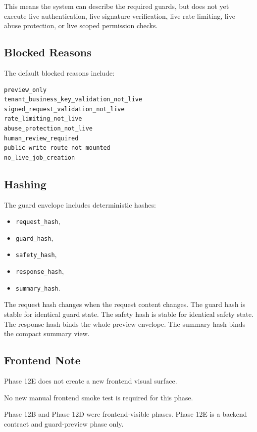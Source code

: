 This means the system can describe the required guards, but does not yet execute live authentication, live signature verification, live rate limiting, live abuse protection, or live scoped permission checks.

\subsection{Blocked Reasons}

The default blocked reasons include:

\begin{verbatim}
preview_only
tenant_business_key_validation_not_live
signed_request_validation_not_live
rate_limiting_not_live
abuse_protection_not_live
human_review_required
public_write_route_not_mounted
no_live_job_creation
\end{verbatim}

\subsection{Hashing}

The guard envelope includes deterministic hashes:

\begin{itemize}
  \item \texttt{request\_hash},
  \item \texttt{guard\_hash},
  \item \texttt{safety\_hash},
  \item \texttt{response\_hash},
  \item \texttt{summary\_hash}.
\end{itemize}

The request hash changes when the request content changes.
The guard hash is stable for identical guard state.
The safety hash is stable for identical safety state.
The response hash binds the whole preview envelope.
The summary hash binds the compact summary view.

\subsection{Frontend Note}

Phase 12E does not create a new frontend visual surface.

No new manual frontend smoke test is required for this phase.

Phase 12B and Phase 12D were frontend-visible phases.
Phase 12E is a backend contract and guard-preview phase only.


